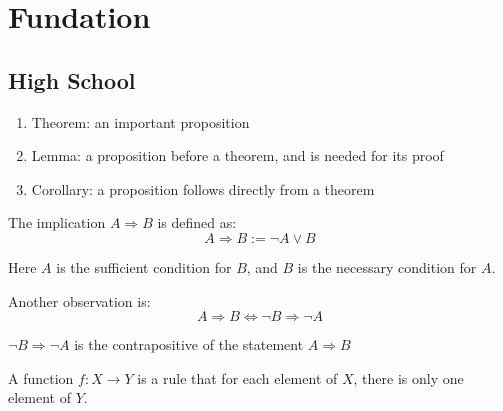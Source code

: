\chapter{Fundation}

\section{High School}

\begin{enumerate}
    \item Theorem: an important proposition
    \item Lemma: a proposition before a theorem, and is needed for its proof
    \item Corollary: a proposition follows directly from a theorem
\end{enumerate}


The implication $A \Rightarrow B$ is defined as:
\begin{equation}
    A \Rightarrow B := \neg A \vee B
\end{equation}

Here $A$ is the sufficient condition for $B$, and $B$ is the necessary condition for $A$.

Another observation is:
\begin{equation}
    A \Rightarrow B \Leftrightarrow \neg B \Rightarrow \neg A
\end{equation}

$\neg B \Rightarrow \neg A$ is the contrapositive of the statement $A \Rightarrow B$


A function $f : X \rightarrow Y$ is a rule that for each element of $X$, there is only one element of $Y$.